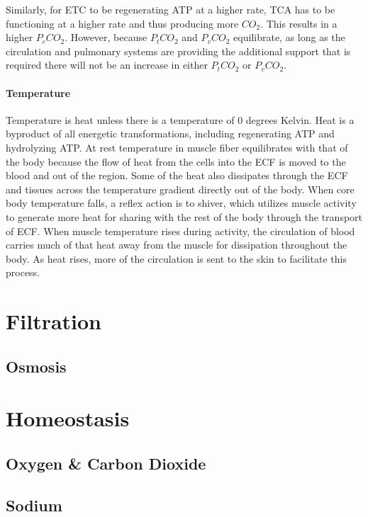 Similarly, for ETC to be regenerating ATP at a higher rate, TCA has to be functioning at a higher rate and thus producing more $CO_2$. This results in a higher $P_c CO_2$. However, because $P_t CO_2$ and $P_v CO_2$ equilibrate, as long as the circulation and pulmonary systems are providing the additional support that is required there will not be an increase in either $P_t CO_2$ or $P_v CO_2$.

\paragraph{Temperature}

Temperature is heat unless there is a temperature of 0 degrees Kelvin. Heat is a byproduct of all energetic transformations, including regenerating ATP and hydrolyzing ATP. At rest temperature in muscle fiber equilibrates with that of the body because the flow of heat from the cells into the ECF is moved to the blood and out of the region. Some of the heat also dissipates through the ECF and tissues across the temperature gradient directly out of the body. When core body temperature falls, a reflex action is to shiver, which utilizes muscle activity to generate more heat for sharing with the rest of the body through the transport of ECF. When muscle temperature rises during activity, the circulation of blood carries much of that heat away from the muscle for dissipation throughout the body. As heat rises, more of the circulation is sent to the skin to facilitate this process.

\section{Filtration}
\subsection{Osmosis}


\section{Homeostasis}

\subsection{Oxygen \& Carbon Dioxide}

\subsection{Sodium}


